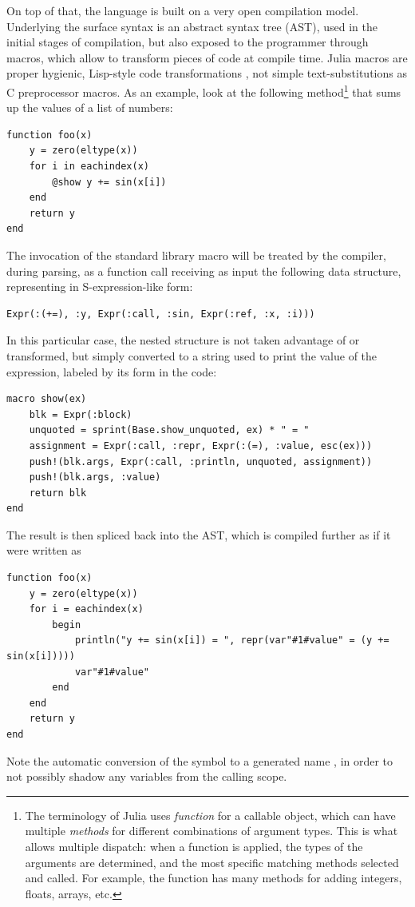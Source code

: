 On top of that, the language is built on a very open compilation model.  Underlying the surface
syntax is an abstract syntax tree (AST), used in the initial stages of compilation, but also exposed
to the programmer through macros, which allow to transform pieces of code at compile time.  Julia
macros are proper hygienic, Lisp-style code transformations \parencite[cf.][]{hoyte2008let}, not
simple text-substitutions as C preprocessor macros.  As an example, look at the following
method\footnote{The terminology of Julia uses \emph{function} for a callable object, which can have
  multiple \emph{methods} for different combinations of argument types.  This is what allows
  multiple dispatch: when a function is applied, the types of the arguments are determined, and the
  most specific matching methods selected and called.  For example, the \protect\jlinl{+} function
  has many methods for adding integers, floats, arrays, etc.} that sums up the  values
of a list of numbers:
\begin{lstlisting}
function foo(x)
    y = zero(eltype(x))
    for i in eachindex(x)
        @show y += sin(x[i])
    end
    return y
end
\end{lstlisting}
The invocation of the standard library macro  will be treated by the compiler, during
parsing, as a function call receiving as input the following data structure, representing  in S-expression-like form:
\begin{lstlisting}
Expr(:(+=), :y, Expr(:call, :sin, Expr(:ref, :x, :i)))
\end{lstlisting}
In this particular case, the nested structure is not taken advantage of or transformed, but simply
converted to a string used to print the value of the expression, labeled by its form in the code:
\begin{lstlisting}
macro show(ex)
    blk = Expr(:block)
    unquoted = sprint(Base.show_unquoted, ex) * " = "
    assignment = Expr(:call, :repr, Expr(:(=), :value, esc(ex)))
    push!(blk.args, Expr(:call, :println, unquoted, assignment))
    push!(blk.args, :value)
    return blk
end
\end{lstlisting}
The result is then spliced back into the AST, which is compiled further as if it were written as
\begin{lstlisting}
function foo(x)
    y = zero(eltype(x))
    for i = eachindex(x)
        begin
            println("y += sin(x[i]) = ", repr(var"#1#value" = (y += sin(x[i]))))
            var"#1#value"
        end
    end
    return y
end
\end{lstlisting}
Note the automatic conversion of the symbol  to a generated name , in
order to not possibly shadow any variables from the calling scope.

